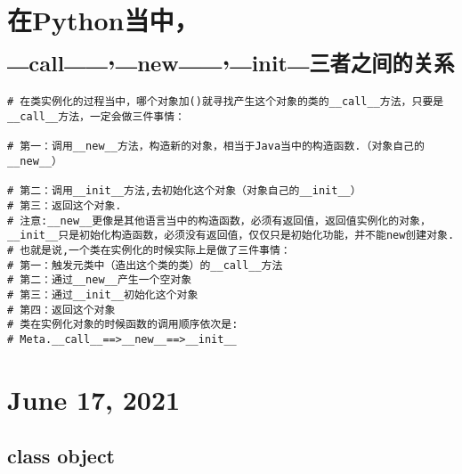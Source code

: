 \documentclass[11pt]{article}
\begin{document}
\section{在Python当中，\_\textsubscript{call}\_\_,\_\textsubscript{new}\_\_,\_\textsubscript{init}\_\textsubscript{三者之间的关系}}
\label{sec:org7f9605c}
\begin{verbatim}
# 在类实例化的过程当中，哪个对象加()就寻找产生这个对象的类的__call__方法，只要是__call__方法，一定会做三件事情：

# 第一：调用__new__方法，构造新的对象，相当于Java当中的构造函数.（对象自己的__new__）

# 第二：调用__init__方法,去初始化这个对象（对象自己的__init__）
# 第三：返回这个对象.
# 注意:__new__更像是其他语言当中的构造函数，必须有返回值，返回值实例化的对象，__init__只是初始化构造函数，必须没有返回值，仅仅只是初始化功能，并不能new创建对象.
# 也就是说,一个类在实例化的时候实际上是做了三件事情：
# 第一：触发元类中（造出这个类的类）的__call__方法
# 第二：通过__new__产生一个空对象
# 第三：通过__init__初始化这个对象
# 第四：返回这个对象
# 类在实例化对象的时候函数的调用顺序依次是:
# Meta.__call__==>__new__==>__init__
\end{verbatim}
\section{June 17, 2021}
\label{sec:org6f0432e}
\subsection{class object}
\label{sec:org1d21a57}
\end{document}

